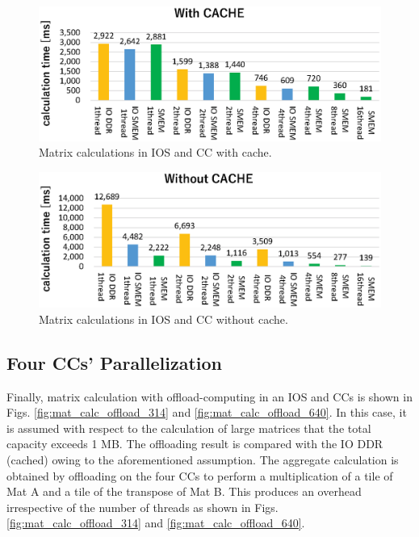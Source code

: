 \clearpage

\begin{figure}[thbp]
  \centering
  \includegraphics[width=.9\linewidth]{../figure/BarGraph_matrix_with_cache.eps}
  \caption{Matrix calculations in IOS and CC with cache.}
  \label{fig:mat_calc_cache}
\end{figure}

\begin{figure}[thbp]
  \centering
  \includegraphics[width=.9\linewidth]{../figure/BarGraph_matrix_without_cache.eps}
  \caption{Matrix calculations in IOS and CC without cache.}
  \label{fig:mat_calc_uncache}
\end{figure}

\subsection{Four CCs' Parallelization}
\label{sec:four_CCs}
Finally, matrix calculation with offload-computing in an IOS and CCs is shown in Figs. \ref{fig:mat_calc_offload_314} and \ref{fig:mat_calc_offload_640}.
In this case, it is assumed with respect to the calculation of large matrices that the total capacity exceeds 1 MB.
The offloading result is compared with the IO DDR (cached) owing to the aforementioned assumption.
The aggregate calculation is obtained by offloading on the four CCs to perform a multiplication of a tile of Mat A and a tile of the transpose of Mat B.
This produces an overhead irrespective of the number of threads as shown in Figs. \ref{fig:mat_calc_offload_314} and \ref{fig:mat_calc_offload_640}.

